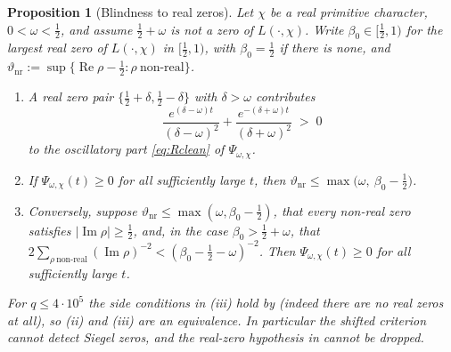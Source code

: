 \documentclass[11pt,reqno]{amsart}
\theoremstyle{plain}
\newtheorem{proposition}[theorem]{Proposition}
\theoremstyle{definition}
\newcommand{\Rp}{\operatorname{Re}}
\newcommand{\Ip}{\operatorname{Im}}
\begin{document}
\begin{proposition}[Blindness to real zeros]\label{prop:siegel}
Let $\chi$ be a real primitive character, $0<\omega<\tfrac12$, and assume $\tfrac12+\omega$ is not
a zero of $L(\cdot,\chi)$. Write $\beta_0\in[\tfrac12,1)$ for the largest real zero of
$L(\cdot,\chi)$ in $[\tfrac12,1)$, with $\beta_0=\tfrac12$ if there is none, and
$\vartheta_{\mathrm{nr}}:=\sup\{\Rp\rho-\tfrac12:\rho\ \text{non-real}\}$.
\begin{enumerate}
\item[(i)] A real zero pair $\{\tfrac12+\delta,\tfrac12-\delta\}$ with $\delta>\omega$ contributes
\[
  \frac{e^{(\delta-\omega)t}}{(\delta-\omega)^{2}}
  +\frac{e^{-(\delta+\omega)t}}{(\delta+\omega)^{2}}\;>\;0
\]
to the oscillatory part \eqref{eq:Rclean} of $\Psi_{\omega,\chi}$.
\item[(ii)] If $\Psi_{\omega,\chi}(t)\ge0$ for all sufficiently large $t$, then
$\vartheta_{\mathrm{nr}}\le\max\bigl(\omega,\ \beta_0-\tfrac12\bigr)$.
\item[(iii)] Conversely, suppose $\vartheta_{\mathrm{nr}}\le\max(\omega,\beta_0-\tfrac12)$, that
every non-real zero satisfies $|\Ip\rho|\ge\tfrac12$, and, in the case $\beta_0>\tfrac12+\omega$,
that $2\sum_{\rho\ \mathrm{non\text{-}real}}(\Ip\rho)^{-2}<(\beta_0-\tfrac12-\omega)^{-2}$. Then
$\Psi_{\omega,\chi}(t)\ge0$ for all sufficiently large $t$.
\end{enumerate}
For $q\le4\cdot10^{5}$ the side conditions in (iii) hold by \cite{Platt2016} (indeed there are no
real zeros at all), so (ii) and (iii) are an equivalence. In particular the shifted criterion
cannot detect Siegel zeros, and the real-zero hypothesis in \cite[Thm.~1.1]{SuzukiSelberg} cannot
be dropped.
\end{proposition}
\end{document}
